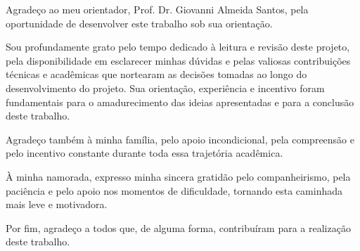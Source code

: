 \begin{agradecimentos}

Agradeço ao meu orientador, Prof. Dr. Giovanni Almeida Santos, pela oportunidade de desenvolver este trabalho sob sua orientação.

Sou profundamente grato pelo tempo dedicado à leitura e revisão deste projeto, pela disponibilidade em esclarecer minhas dúvidas e pelas valiosas contribuições técnicas e acadêmicas que nortearam as decisões tomadas ao longo do desenvolvimento do projeto. Sua orientação, experiência e incentivo foram fundamentais para o amadurecimento das ideias apresentadas e para a conclusão deste trabalho.

Agradeço também à minha família, pelo apoio incondicional, pela compreensão e pelo incentivo constante durante toda essa trajetória acadêmica.

À minha namorada, expresso minha sincera gratidão pelo companheirismo, pela paciência e pelo apoio nos momentos de dificuldade, tornando esta caminhada mais leve e motivadora.

Por fim, agradeço a todos que, de alguma forma, contribuíram para a realização deste trabalho.

\end{agradecimentos}
